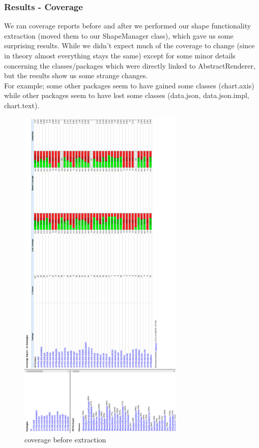 \documentclass{article}
\begin{document}
\subsubsection{Results - Coverage}

We ran coverage reports before and after we performed our shape functionality extraction (moved them to our ShapeManager class), which gave us some surprising results. While we didn't expect much of the coverage to change (since in theory almost everything stays the same) except for some minor details concerning the classes/packages which were directly linked to AbstractRenderer, but the results show us some strange changes.\\

For example; some other packages seem to have gained some classes (chart.axis) while other packages seem to have lost some classes (data.json, data.json.impl, chart.text).

\newpage
\begin{figure}[H]
\centering
	\includegraphics[width=0.7\textwidth]{coverage/BEFORE.png}
	\caption{coverage before extraction}
\end{figure}
\end{document}

